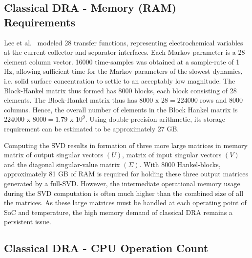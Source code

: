 \subsection{Classical DRA - Memory (RAM) Requirements\label{subsec:Traditional-DRA--Memory}}

Lee et al.~\citep{LeeChemistruckPlett2012} modeled 28 transfer functions,
representing electrochemical variables at the current collector and
separator interfaces. Each Markov parameter is a 28 element column
vector. 16000 time-samples was obtained at a sample-rate of 1 Hz,
allowing sufficient time for the Markov parameters of the slowest
dynamics, i.e. solid surface concentration to settle to an acceptably
low magnitude. The Block-Hankel matrix thus formed has 8000 blocks,
each block consisting of 28 elements. The Block-Hankel matrix thus
has $8000\text{ x }28=224000$ rows and 8000 columns. Hence, the overall
number of elements in the Block Hankel matrix is $224000\text{ x }8000=1.79\text{ x }10^{9}$.
Using double-precision arithmetic, its storage requirement can be
estimated to be approximately 27 GB.

Computing the SVD results in formation of three more large matrices
in memory \textendash{} matrix of output singular vectors $\left(U\right)$,
matrix of input singular vectors $\left(V\right)$ and the diagonal
singular-value matrix $\left(\Sigma\right)$. With 8000 Hankel-blocks,
approximately 81 GB of RAM is required for holding these three output
matrices generated by a full-SVD. However, the intermediate operational
memory usage during the SVD computation is often much higher than
the combined size of all the matrices. As these large matrices must
be handled at each operating point of SoC and temperature, the high
memory demand of classical DRA remains a persistent issue.

\subsection{Classical DRA - CPU Operation Count\label{subsec:Traditional-DRA--CPU}}

